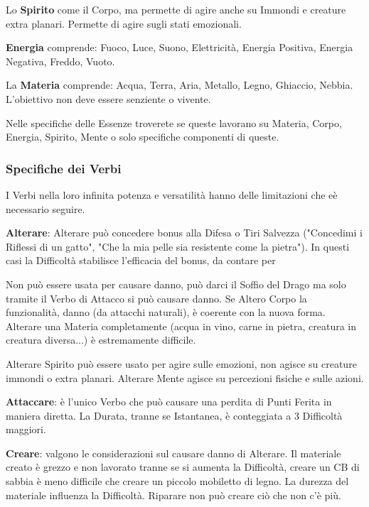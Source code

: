 \documentclass[a4paper,twoside,openany]{book}
\begin{document}
\begin{multicols}{2}
Lo \textbf{Spirito} come il Corpo, ma permette di agire anche su Immondi e creature extra planari. Permette di agire sugli stati emozionali.

\textbf{Energia} comprende: Fuoco, Luce, Suono, Elettricità, Energia Positiva, Energia Negativa, Freddo, Vuoto.

La \textbf{Materia} comprende: Acqua, Terra, Aria, Metallo, Legno, Ghiaccio, Nebbia. L'obiettivo non deve essere senziente o vivente.

\bigskip

Nelle specifiche delle Essenze troverete se queste lavorano su Materia, Corpo, Energia, Spirito, Mente o solo specifiche componenti di queste.

\subsubsection{Specifiche dei Verbi}

I Verbi nella loro infinita potenza e versatilità hanno delle limitazioni che eè necessario seguire.

\textbf{Alterare}:  Alterare può concedere bonus alla Difesa o Tiri Salvezza ("Concedimi i Riflessi di un gatto", "Che la mia pelle sia resistente come la pietra"). In questi casi la Difficoltà stabilisce l'efficacia del bonus, da contare per

Non può essere usata per causare danno, può darci il Soffio del Drago ma solo tramite il Verbo di Attacco si può causare danno. Se Altero Corpo la funzionalità, danno (da attacchi naturali), è coerente con la nuova forma.
Alterare una Materia completamente (acqua in vino, carne in pietra, creatura in creatura diversa...) è estremamente difficile.

Alterare Spirito può essere usato per agire sulle emozioni, non agisce su creature immondi o extra planari. Alterare Mente agisce su percezioni fisiche e sulle azioni.

\textbf{Attaccare}: è l'unico Verbo che può causare una perdita di Punti Ferita in maniera diretta. La Durata, tranne se Istantanea, è conteggiata a 3 Difficoltà maggiori.

\textbf{Creare}: valgono le considerazioni sul causare danno di Alterare. Il materiale creato è grezzo e non lavorato tranne se si aumenta la Difficoltà, creare un CB di sabbia è meno difficile che creare un piccolo mobiletto di legno. La durezza del materiale influenza la Difficoltà. Riparare non può creare ciò che non c'è più.


\end{multicols}
\end{document}
